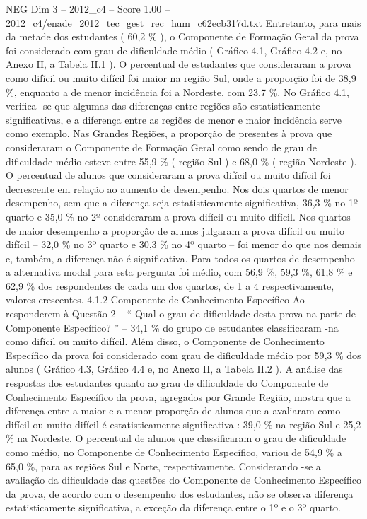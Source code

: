\begin{textsample}{NEG Dim 3 – 2012\_c4 – Score 1.00 – 2012\_c4/enade\_2012\_tec\_gest\_rec\_hum\_c62ecb317d.txt}
Entretanto, para mais da metade dos estudantes ( 60,2 \% ), o Componente de Formação Geral da prova foi considerado com grau de dificuldade médio ( Gráfico 4.1, Gráfico 4.2 e, no Anexo II, a Tabela II.1 ).
O percentual de estudantes que consideraram a prova como difícil ou muito difícil foi maior na região Sul, onde a proporção foi de 38,9 \%, enquanto a de menor incidência foi a Nordeste, com 23,7 \%.
No Gráfico 4.1, verifica -se que algumas das diferenças entre regiões são estatisticamente significativas, e a diferença entre as regiões de menor e maior incidência serve como exemplo.
Nas Grandes Regiões, a proporção de presentes à prova que consideraram o Componente de Formação Geral como sendo de grau de dificuldade médio esteve entre 55,9 \% ( região Sul ) e 68,0 \% ( região Nordeste ).
O percentual de alunos que consideraram a prova difícil ou muito difícil foi decrescente em relação ao aumento de desempenho.
Nos dois quartos de menor desempenho, sem que a diferença seja estatisticamente significativa, 36,3 \% no 1º quarto e 35,0 \% no 2º consideraram a prova difícil ou muito difícil.
Nos quartos de maior desempenho a proporção de alunos julgaram a prova difícil ou muito difícil – 32,0 \% no 3º quarto e 30,3 \% no 4º quarto – foi menor do que nos demais e, também, a diferença não é significativa.
Para todos os quartos de desempenho a alternativa modal para esta pergunta foi médio, com 56,9 \%, 59,3 \%, 61,8 \% e 62,9 \% dos respondentes de cada um dos quartos, de 1 a 4 respectivamente, valores crescentes. 4.1.2 Componente de Conhecimento Específico Ao responderem à Questão 2 – “ Qual o grau de dificuldade desta prova na parte de Componente Específico? ” – 34,1 \% do grupo de estudantes classificaram -na como difícil ou muito difícil.
Além disso, o Componente de Conhecimento Específico da prova foi considerado com grau de dificuldade médio por 59,3 \% dos alunos ( Gráfico 4.3, Gráfico 4.4 e, no Anexo II, a Tabela II.2 ).
A análise das respostas dos estudantes quanto ao grau de dificuldade do Componente de Conhecimento Específico da prova, agregados por Grande Região, mostra que a diferença entre a maior e a menor proporção de alunos que a avaliaram como difícil ou muito difícil é estatisticamente significativa : 39,0 \% na região Sul e 25,2 \% na Nordeste.
O percentual de alunos que classificaram o grau de dificuldade como médio, no Componente de Conhecimento Específico, variou de 54,9 \% a 65,0 \%, para as regiões Sul e Norte, respectivamente.
Considerando -se a avaliação da dificuldade das questões do Componente de Conhecimento Específico da prova, de acordo com o desempenho dos estudantes, não se observa diferença estatisticamente significativa, a exceção da diferença entre o 1º e o 3º quarto.

\end{textsample}

